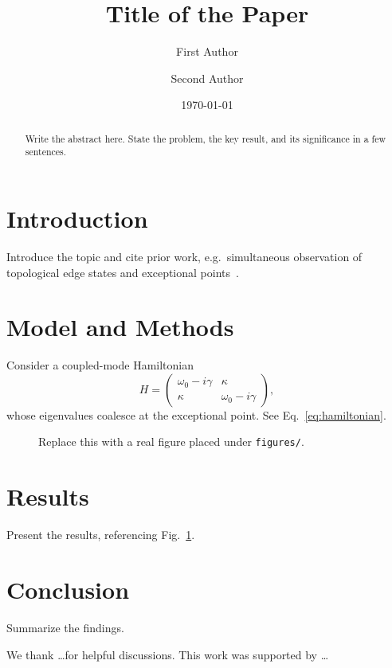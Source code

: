 \documentclass[%
  reprint,                    %
  amsmath,amssymb,
  superscriptaddress,
  longbibliography,
]{revtex4-2}
\begin{document}
\title{Title of the Paper}

\author{First Author}
\author{Second Author}

\date{\today}

\begin{abstract}
Write the abstract here. State the problem, the key result, and its significance
in a few sentences.
\end{abstract}

\maketitle

\section{Introduction}
\label{sec:intro}

Introduce the topic and cite prior work, e.g.\ simultaneous observation of
topological edge states and exceptional points~\cite{zhu2018simultaneous}.

\section{Model and Methods}
\label{sec:model}

Consider a coupled-mode Hamiltonian
\begin{equation}
  H =
  \begin{pmatrix}
    \omega_0 - i\gamma & \kappa \\
    \kappa & \omega_0 - i\gamma
  \end{pmatrix},
  \label{eq:hamiltonian}
\end{equation}
whose eigenvalues coalesce at the exceptional point. See Eq.~\eqref{eq:hamiltonian}.

\begin{figure}[t]
  \centering
  \caption{Replace this with a real figure placed under \texttt{figures/}.}
  \label{fig:spectrum}
\end{figure}

\section{Results}
\label{sec:results}

Present the results, referencing Fig.~\ref{fig:spectrum}.

\section{Conclusion}
\label{sec:conclusion}

Summarize the findings.

\begin{acknowledgments}
We thank \ldots for helpful discussions. This work was supported by \ldots
\end{acknowledgments}


\end{document}
